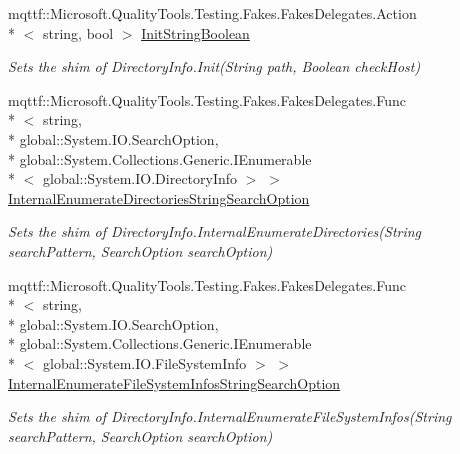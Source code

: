 \begin{DoxyCompactItemize}
mqttf\-::\-Microsoft.\-Quality\-Tools.\-Testing.\-Fakes.\-Fakes\-Delegates.\-Action\\*
$<$ string, bool $>$ \hyperlink{class_system_1_1_i_o_1_1_fakes_1_1_shim_directory_info_acbb18a0aec800e36752910aaff9de405}{Init\-String\-Boolean}
\begin{DoxyCompactList}\small\item\em Sets the shim of Directory\-Info.\-Init(\-String path, Boolean check\-Host)\end{DoxyCompactList}\item 
mqttf\-::\-Microsoft.\-Quality\-Tools.\-Testing.\-Fakes.\-Fakes\-Delegates.\-Func\\*
$<$ string, \\*
global\-::\-System.\-I\-O.\-Search\-Option, \\*
global\-::\-System.\-Collections.\-Generic.\-I\-Enumerable\\*
$<$ global\-::\-System.\-I\-O.\-Directory\-Info $>$ $>$ \hyperlink{class_system_1_1_i_o_1_1_fakes_1_1_shim_directory_info_afc02fae419bc0c6c48143b0b5e027783}{Internal\-Enumerate\-Directories\-String\-Search\-Option}
\begin{DoxyCompactList}\small\item\em Sets the shim of Directory\-Info.\-Internal\-Enumerate\-Directories(\-String search\-Pattern, Search\-Option search\-Option)\end{DoxyCompactList}\item 
mqttf\-::\-Microsoft.\-Quality\-Tools.\-Testing.\-Fakes.\-Fakes\-Delegates.\-Func\\*
$<$ string, \\*
global\-::\-System.\-I\-O.\-Search\-Option, \\*
global\-::\-System.\-Collections.\-Generic.\-I\-Enumerable\\*
$<$ global\-::\-System.\-I\-O.\-File\-System\-Info $>$ $>$ \hyperlink{class_system_1_1_i_o_1_1_fakes_1_1_shim_directory_info_ae33c09c51b32b3030587794fb99aa7b1}{Internal\-Enumerate\-File\-System\-Infos\-String\-Search\-Option}
\begin{DoxyCompactList}\small\item\em Sets the shim of Directory\-Info.\-Internal\-Enumerate\-File\-System\-Infos(\-String search\-Pattern, Search\-Option search\-Option)\end{DoxyCompactList}\item 

\end{DoxyCompactItemize}
